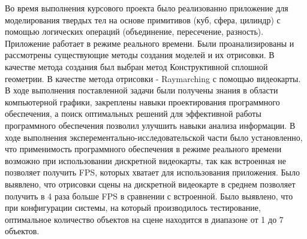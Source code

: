 \Conclusion %
 
Во время выполнения курсового проекта было реализованно приложение для моделирования твердых тел
на основе примитивов (куб, сфера, цилиндр) с помощью
логических операций (объединение, пересечение, разность). Приложение работает в режиме реального времени.
Были проанализированы и рассмотрены существующие методы создания моделей и их отрисовки.
В качестве метода создания был выбран метод Конструктивной сплошной геометрии.
В качестве метода отрисовки - Raymarching с помощью видеокарты.
В ходе выполнения поставленной задачи были получены знания в области компьютерной графики,
закреплены навыки проектирования программного обеспечения, а поиск оптимальных решений для эффективной работы программного обеспечения позволил улучшить навыки анализа информации.
 В ходе выполнения эксперементально-исследовательской части было
установленно, что применимость программного обеспечения в режиме реального
времени возможно при использовании дискретной видеокарты, так как встроенная
не позволяет получить FPS, которых хватает для использования приложения. Было выявлено,
что отрисовки сцены на дискретной видеокарте в среднем позволяет получить в 4 раза больше
FPS в сравнении с встроенной. Было выявлено, что при конфигурации системы, на который производилось
тестирование, оптимальное количество объектов на сцене находится в диапазоне от 1 до 7 объектов.
 
 
 

